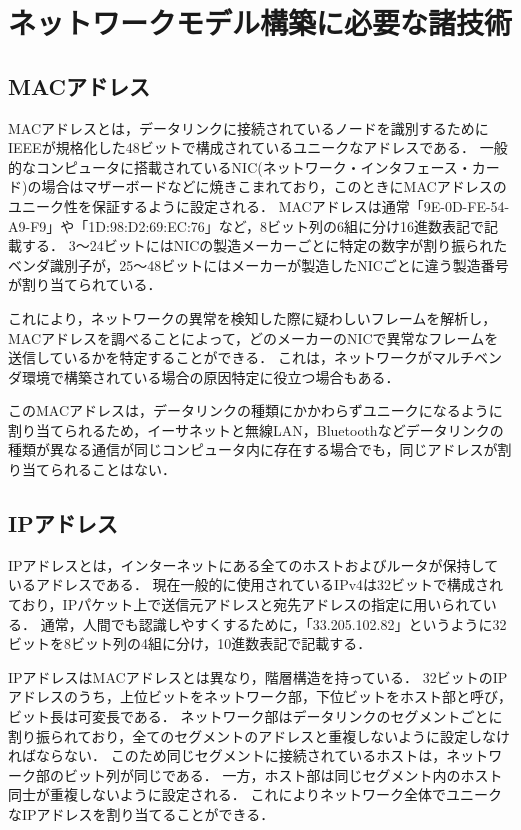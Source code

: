 \section{ネットワークモデル構築に必要な諸技術}

\subsection{MACアドレス}

MACアドレスとは，データリンクに接続されているノードを識別するためにIEEEが規格化した48ビットで構成されているユニークなアドレスである\cite{masteringtcpip}．
一般的なコンピュータに搭載されているNIC(ネットワーク・インタフェース・カード)の場合はマザーボードなどに焼きこまれており，このときにMACアドレスのユニーク性を保証するように設定される．
MACアドレスは通常「9E-0D-FE-54-A9-F9」や「1D:98:D2:69:EC:76」など，8ビット列の6組に分け16進数表記で記載する．
3～24ビットにはNICの製造メーカーごとに特定の数字が割り振られたベンダ識別子が，25～48ビットにはメーカーが製造したNICごとに違う製造番号が割り当てられている．

これにより，ネットワークの異常を検知した際に疑わしいフレームを解析し，MACアドレスを調べることによって，どのメーカーのNICで異常なフレームを送信しているかを特定することができる．
これは，ネットワークがマルチベンダ環境で構築されている場合の原因特定に役立つ場合もある．

このMACアドレスは，データリンクの種類にかかわらずユニークになるように割り当てられるため，イーサネットと無線LAN，Bluetoothなどデータリンクの種類が異なる通信が同じコンピュータ内に存在する場合でも，同じアドレスが割り当てられることはない．

\subsection{IPアドレス}

IPアドレスとは，インターネットにある全てのホストおよびルータが保持しているアドレスである\cite{tanenbaum}．
現在一般的に使用されているIPv4は32ビットで構成されており，IPパケット上で送信元アドレスと宛先アドレスの指定に用いられている．
通常，人間でも認識しやすくするために，「33.205.102.82」というように32ビットを8ビット列の4組に分け，10進数表記で記載する．

IPアドレスはMACアドレスとは異なり，階層構造を持っている\cite{masteringtcpip}．
32ビットのIPアドレスのうち，上位ビットをネットワーク部，下位ビットをホスト部と呼び，ビット長は可変長である．
ネットワーク部はデータリンクのセグメントごとに割り振られており，全てのセグメントのアドレスと重複しないように設定しなければならない．
このため同じセグメントに接続されているホストは，ネットワーク部のビット列が同じである．
一方，ホスト部は同じセグメント内のホスト同士が重複しないように設定される．
これによりネットワーク全体でユニークなIPアドレスを割り当てることができる．

